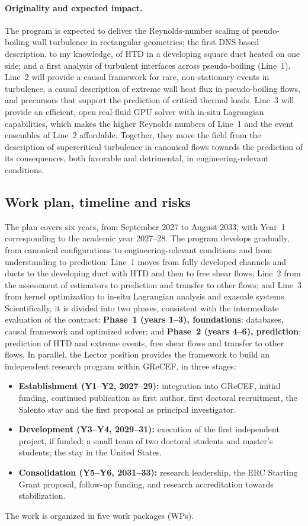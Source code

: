 \documentclass[11pt]{article}
\begin{document}
\paragraph{Originality and expected impact.} The program is expected to deliver the
Reynolds-number scaling of pseudo-boiling wall turbulence in rectangular geometries; the first
DNS-based description, to my knowledge, of HTD in a developing square duct heated on one side;
and a first analysis of turbulent interfaces across pseudo-boiling (Line~1). Line~2 will provide
a causal framework for rare, non-stationary events in turbulence, a causal description of extreme
wall heat flux in pseudo-boiling flows, and precursors that support the prediction of critical
thermal loads. Line~3 will provide an efficient, open real-fluid GPU solver with in-situ
Lagrangian capabilities, which makes the higher Reynolds numbers of Line~1 and the event
ensembles of Line~2 affordable. Together, they move the field from the description of
supercritical turbulence in canonical flows towards the prediction of its consequences, both
favorable and detrimental, in engineering-relevant conditions.

\subsection{Work plan, timeline and risks}\label{sec:workplan}
The plan covers six years, from September 2027 to August 2033, with Year~1 corresponding to
the academic year 2027--28. The program develops gradually, from canonical configurations to
engineering-relevant conditions and from understanding to prediction: Line~1 moves from fully
developed channels and ducts to the developing duct with HTD and then to free shear flows;
Line~2 from the assessment of estimators to prediction and transfer to other flows; and Line~3
from kernel optimization to in-situ Lagrangian analysis and exascale systems. Scientifically, it is divided into two phases, consistent with the
intermediate evaluation of the contract: \textbf{Phase~1 (years 1--3), foundations}:
databases, causal framework and optimized solver; and \textbf{Phase~2 (years 4--6),
prediction}: prediction of HTD and extreme events, free shear flows and transfer to other
flows. In parallel, the Lector position
provides the framework to build an independent research program within GReCEF, in three
stages:
\begin{itemize}
  \item \textbf{Establishment (Y1--Y2, 2027--29):} integration into GReCEF, initial funding,
  continued publication as first author, first doctoral recruitment, the Salento stay and the first proposal as principal
  investigator.
  \item \textbf{Development (Y3--Y4, 2029--31):} execution of the first independent project,
  if funded; a small team of two doctoral students and master's students; the stay in the
  United States.
  \item \textbf{Consolidation (Y5--Y6, 2031--33):} research leadership, the ERC Starting Grant
  proposal, follow-up funding, and research accreditation towards stabilization.
\end{itemize}
The work is organized in five work packages (WPs).
\end{document}
